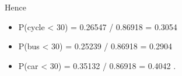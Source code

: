 \documentclass[a4paper,12pt]{article}
\begin{document}
\begin{enumerate}
Hence 
\begin{itemize}
\item P(cycle < 30) = 0.26547 / 0.86918 = 0.3054
\item P(bus < 30) = 0.25239 / 0.86918 = 0.2904
\item P(car < 30) = 0.35132 / 0.86918 = 0.4042 .
\end{itemize}
\end{enumerate}
\end{document}

